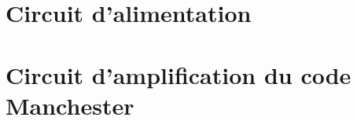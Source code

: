 
\section{Circuit d'alimentation}
\label{s:Alimentation}




\section{Circuit d'amplification du code Manchester}
\label{s:Manchester}



